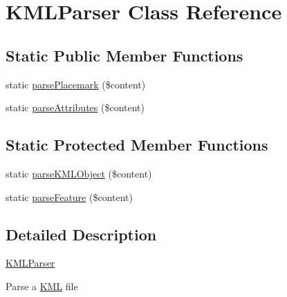 \hypertarget{classKMLParser}{
\section{KMLParser Class Reference}
\label{d1/df2/classKMLParser}
}
\subsection*{Static Public Member Functions}
\begin{DoxyCompactItemize}
\item 
static \hyperlink{classKMLParser_ac96e24f6241b8b4a4dfb86241a4f0570}{parsePlacemark} (\$content)
\item 
static \hyperlink{classKMLParser_ae604dd39cbff09bf253fa8d4ab846d60}{parseAttributes} (\$content)
\end{DoxyCompactItemize}
\subsection*{Static Protected Member Functions}
\begin{DoxyCompactItemize}
\item 
static \hyperlink{classKMLParser_ab85a445c09eb977ae845812d6611adfa}{parseKMLObject} (\$content)
\item 
static \hyperlink{classKMLParser_ac116ed02c5b3a52a044280bd6f002772}{parseFeature} (\$content)
\end{DoxyCompactItemize}


\subsection{Detailed Description}
\hyperlink{classKMLParser}{KMLParser}

Parse a \hyperlink{classKML}{KML} file 

